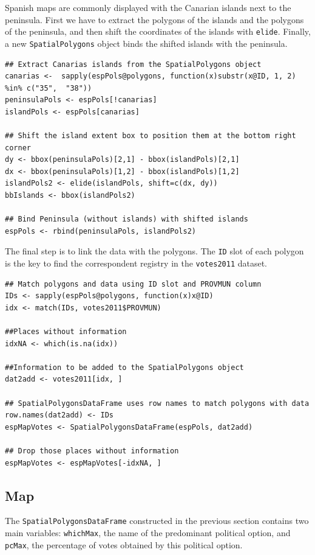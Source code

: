 \documentclass[smallroyalvopaper]{memoir}
\begin{document}
Spanish maps are commonly displayed with the Canarian islands next
to the peninsula. First we have to extract the polygons of the
islands and the polygons of the peninsula, and then shift the
coordinates of the islands with \texttt{elide}. Finally, a new
\texttt{SpatialPolygons} object binds the shifted islands with the
peninsula.

\lstset{language=R,numbers=none}
\begin{lstlisting}
## Extract Canarias islands from the SpatialPolygons object
canarias <-  sapply(espPols@polygons, function(x)substr(x@ID, 1, 2) %in% c("35",  "38"))
peninsulaPols <- espPols[!canarias]
islandPols <- espPols[canarias]

## Shift the island extent box to position them at the bottom right corner
dy <- bbox(peninsulaPols)[2,1] - bbox(islandPols)[2,1]
dx <- bbox(peninsulaPols)[1,2] - bbox(islandPols)[1,2]
islandPols2 <- elide(islandPols, shift=c(dx, dy))
bbIslands <- bbox(islandPols2)

## Bind Peninsula (without islands) with shifted islands
espPols <- rbind(peninsulaPols, islandPols2)
\end{lstlisting}

The final step is to link the data with the polygons. The \texttt{ID} slot of
each polygon is the key to find the correspondent registry in the
\texttt{votes2011} dataset.
\lstset{language=R,numbers=none}
\begin{lstlisting}
## Match polygons and data using ID slot and PROVMUN column
IDs <- sapply(espPols@polygons, function(x)x@ID)
idx <- match(IDs, votes2011$PROVMUN)

##Places without information
idxNA <- which(is.na(idx))

##Information to be added to the SpatialPolygons object
dat2add <- votes2011[idx, ]

## SpatialPolygonsDataFrame uses row names to match polygons with data
row.names(dat2add) <- IDs
espMapVotes <- SpatialPolygonsDataFrame(espPols, dat2add)

## Drop those places without information
espMapVotes <- espMapVotes[-idxNA, ]
\end{lstlisting}
\subsection{Map}
\label{sec-1-2}
\label{sec:map}
The \texttt{SpatialPolygonsDataFrame} constructed in the previous section
contains two main variables: \texttt{whichMax}, the name of the predominant
political option, and \texttt{pcMax}, the percentage of votes obtained by
this political option.
\end{document}
